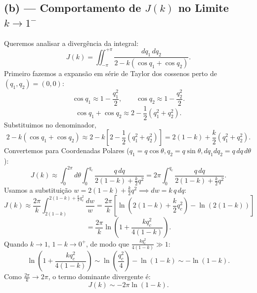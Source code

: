 \documentclass[11pt,a4paper]{article}
\begin{document}
\subsection*{(b) --- Comportamento de $J(k)$ no Limite $k \to 1^-$}
%
Queremos analisar a divergência da integral:
%
\begin{equation}
    J(k) = \iint_{-\pi}^{+\pi} \frac{dq_1\,dq_2}{2 - k(\cos q_1 + \cos q_2)}.
\end{equation}
%
Primeiro fazemos a expansão em série de Taylor dos cossenos perto de $(q_1,q_2) = (0,0)$:
%
\begin{equation}
        \cos q_1 \approx 1 - \frac{q_1^2}{2}, \qquad \cos q_2 \approx 1 - \frac{q_2^2}{2}.
\end{equation}
%
\begin{equation}
        \cos q_1 + \cos q_2 \approx 2 - \frac{1}{2}(q_1^2 + q_2^2).
\end{equation}
%
Substituimos no denominador,
%
\begin{equation}
        2 - k(\cos q_1 + \cos q_2) \approx 2 - k\left[2 - \frac{1}{2}(q_1^2 + q_2^2)\right] = 2(1-k) + \frac{k}{2}(q_1^2 + q_2^2).
\end{equation}
%
Convertemos para Coordenadas Polares 
($q_1 = q\cos\theta, q_2 = q\sin\theta, dq_1 dq_2 = q\,dq\,d\theta$):
%
\begin{equation}
        J(k) \approx \int_0^{2\pi} d\theta \int_0^{q_c} \frac{q\,dq}{2(1-k) + \frac{k}{2}q^2} = 2\pi \int_0^{q_c} \frac{q\,dq}{2(1-k) + \frac{k}{2}q^2}.
\end{equation}
%
Usamos a substituição $w = 2(1-k) + \frac{k}{2}q^2 \implies dw = k\,q\,dq$:
%
\begin{equation}
        J(k) \approx \frac{2\pi}{k} \int_{2(1-k)}^{2(1-k) + \frac{k}{2}q_c^2} \frac{dw}{w} 
        = \frac{2\pi}{k} \left[ \ln\left(2(1-k) + \frac{k}{2}q_c^2\right) - \ln(2(1-k)) \right]
\end{equation}
%    
\begin{equation}
        = \frac{2\pi}{k} \ln\left( 1 + \frac{k q_c^2}{4(1-k)} \right).
\end{equation}
%
Quando $k \to 1$, $1-k \to 0^+$, de modo que $\frac{k q_c^2}{4(1-k)} \gg 1$:
%
\begin{equation}
        \ln\left( 1 + \frac{k q_c^2}{4(1-k)} \right) \sim \ln\left(\frac{q_c^2}{4}\right) - \ln(1-k) \sim -\ln(1-k).
\end{equation}
%
Como $\frac{2\pi}{k} \to 2\pi$, o termo dominante divergente é:
%
\begin{equation}
    \boxed{J(k) \sim -2\pi \ln(1-k).}
\end{equation}
%
\end{document}
